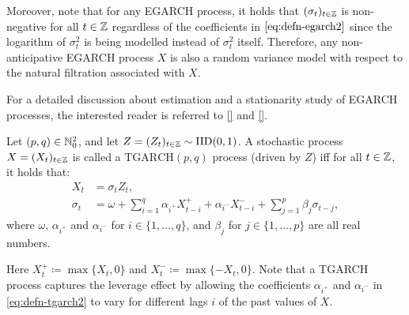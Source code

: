 
Moreover, note that for any EGARCH process, it holds that $(\sigma_{t})_{t\in\mathbb{Z}}$ is non-negative for all $t\in\mathbb{Z}$ regardless of the coefficients in $\eqref{eq:defn-egarch2}$ since the logarithm of $\sigma_{t}^{2}$ is being modelled instead of $\sigma_{t}^{2}$ itself. Therefore, any non-anticipative EGARCH process $X$ is also a random variance model with respect to the natural filtration associated with $X$.

For a detailed discussion about estimation and a stationarity study of EGARCH processes, the interested reader is referred to \ref{} and \ref{}. %
\begin{defn}
Let $(p,q)\in\mathbb{N}_{0}^{2}$, and let $Z=(Z_{t})_{t\in\mathbb{Z}}\sim\mathrm{IID}(0,1)$. A stochastic process $X=(X_{t})_{t\in\mathbb{Z}}$ is called a $\mathrm{TGARCH}(p,q)$ process (driven by $Z$) iff for all $t\in\mathbb{Z}$, it holds that:
\begin{subequations}\label{eq:defn-tgarch}
\begin{align}
    X_{t}&=\sigma_{t}Z_{t}, \label{eq:defn-tgarch1}\\
    \sigma_{t}&=\omega+\sum_{i=1}^{q}\alpha_{i^{+}}X_{t-i}^{+}+\alpha_{i^{-}}X_{t-i}^{-}+\sum_{j=1}^{p}\beta_{j}\sigma_{t-j}\label{eq:defn-tgarch2},
\end{align}
\end{subequations}
where $\omega$, $\alpha_{i^{+}}$ and $\alpha_{i^{-}}$ for $i\in\{1,\dots,q\}$, and $\beta_{j}$ for $j\in\{1,\dots,p\}$ are all real numbers.
\end{defn}
Here $X_{t}^{+}\coloneqq\max\{X_{t},0\}$ and $X_{t}^{-}\coloneqq\max\{-X_{t},0\}$. Note that a TGARCH process captures the leverage effect by allowing the coefficients $\alpha_{i^{+}}$ and $\alpha_{i^{-}}$ in \eqref{eq:defn-tgarch2} to vary for different lags $i$ of the past values of $X$. 

